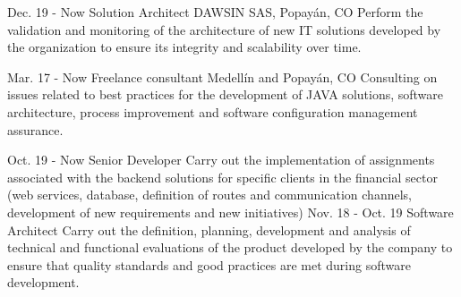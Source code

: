\documentclass[american]{cv-class}
\begin{document}
\begin{entrylist}
	\entry
	{Dec. 19 - Now}
	{Solution Architect}
	{DAWSIN SAS, Popayán, CO}
	{Perform the validation and monitoring of the architecture
	of new IT solutions developed by the organization to ensure its integrity and scalability over time.}
	
	\entry
	{Mar. 17 - Now}
	{Freelance consultant}
	{Medellín and Popayán, CO}
	{Consulting on issues related to best practices for the development of JAVA solutions, software architecture, process improvement and software configuration management assurance.}
	  
	\entry
	{Oct. 19 - Now}
	{Senior Developer}
	{ }
	{Carry out the implementation of assignments associated with the backend solutions for specific clients in the financial sector (web services, database, definition of routes and communication channels, development of new requirements and new initiatives)}
	\entry
	{Nov. 18 - Oct. 19}
	{Software Architect}
	{ }
	{Carry out the definition, planning, development and analysis of technical and functional evaluations of the product developed by the company to ensure that quality standards and good practices are met during software development.}
	    

\end{entrylist}
\end{document}
